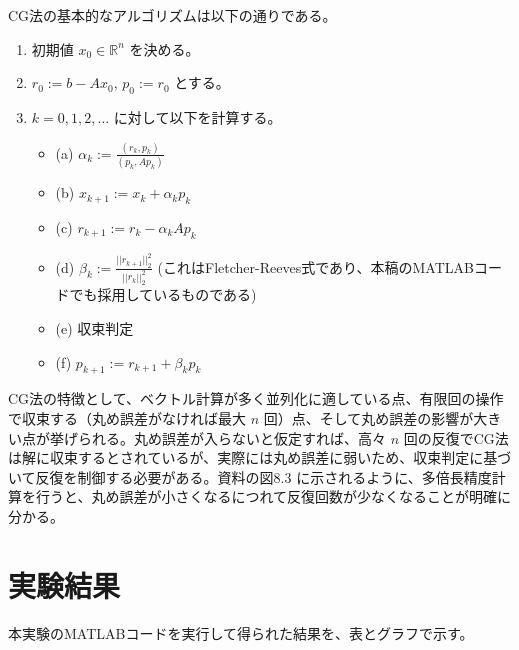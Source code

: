 \documentclass{article}
\begin{document}
CG法の基本的なアルゴリズムは以下の通りである。
\begin{enumerate}
    \item 初期値 $x_0 \in \mathbb{R}^n$ を決める。
    \item $r_0 := b - Ax_0$, $p_0 := r_0$ とする。
    \item $k = 0, 1, 2, \dots$ に対して以下を計算する。
    \begin{itemize}
        \item (a) $\alpha_k := \frac{(r_k, p_k)}{(p_k, Ap_k)}$
        \item (b) $x_{k+1} := x_k + \alpha_k p_k$
        \item (c) $r_{k+1} := r_k - \alpha_k Ap_k$
        \item (d) $\beta_k := \frac{||r_{k+1}||_2^2}{||r_k||_2^2}$ (これはFletcher-Reeves式であり、本稿のMATLABコードでも採用しているものである)
        \item (e) 収束判定
        \item (f) $p_{k+1} := r_{k+1} + \beta_k p_k$
    \end{itemize}
\end{enumerate}

CG法の特徴として、ベクトル計算が多く並列化に適している点、有限回の操作で収束する（丸め誤差がなければ最大 $n$ 回）点、そして丸め誤差の影響が大きい点が挙げられる。丸め誤差が入らないと仮定すれば、高々 $n$ 回の反復でCG法は解に収束するとされているが、実際には丸め誤差に弱いため、収束判定に基づいて反復を制御する必要がある。資料の図8.3 に示されるように、多倍長精度計算を行うと、丸め誤差が小さくなるにつれて反復回数が少なくなることが明確に分かる。

\section{実験結果}
本実験のMATLABコードを実行して得られた結果を、表とグラフで示す。
\end{document}

